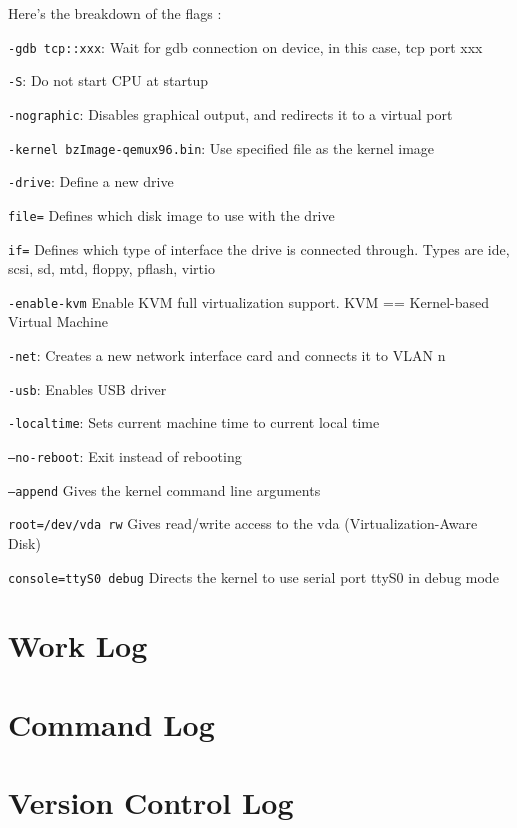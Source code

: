\documentclass[10pt,letterpaper]{article}
\begin{document}
      \noindent Here's the breakdown of the flags \cite{anthonyl.2010}: \\
      \begin{description}
          \item \texttt{-gdb tcp::xxx}: Wait for gdb connection on device, in
          this case, tcp port xxx
          \item \texttt{-S}: Do not start CPU at startup
          \item \texttt{-nographic}: Disables graphical output, and redirects it
          to a virtual port
          \item \texttt{-kernel bzImage-qemux96.bin}: Use specified file as the
          kernel image
          \item \texttt{-drive}: Define a new drive
          \begin{description}
            \item \texttt{file=} Defines which disk image to use with the drive
            \item \texttt{if=} Defines which type of interface the drive is connected
            through. Types are ide, scsi, sd, mtd, floppy, pflash, virtio
          \end{description}
          \item \texttt{-enable-kvm} Enable KVM full virtualization support. KVM
          == Kernel-based Virtual Machine
          \item \texttt{-net}: Creates a new network interface card and connects
          it to VLAN n
          \item \texttt{-usb}: Enables USB driver
          \item \texttt{-localtime}: Sets current machine time to current local
          time
          \item \texttt{--no-reboot}: Exit instead of rebooting
          \item \texttt{--append} Gives the kernel command line arguments
          \begin{description}
            \item \texttt{root=/dev/vda rw} Gives read/write access to the vda
            (Virtualization-Aware Disk)
            \item \texttt{console=ttyS0 debug} Directs the kernel to use serial
            port ttyS0 in debug mode
          \end{description}
      \end{description}
\section{Work Log}

\section{Command Log}

\section{Version Control Log}

\clearpage



\end{document}
